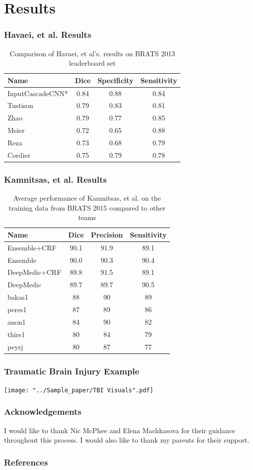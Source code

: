 \documentclass{beamer}
\begin{document}
\section*{Results}

\begin{frame} 
	\frametitle{Havaei, et al. Results}
	\begin{table}
	\begin{tabular}{l | c | c | c }
	Name & Dice & Specificity & Sensitivity\\
	\hline
	\cellcolor{blue!25}InputCascadeCNN* & 0.84 & 0.88 & 0.84\\
	Tustison & 0.79 & 0.83 & 0.81\\
	Zhao & 0.79 & 0.77 & 0.85\\
	Meier & 0.72 & 0.65 & 0.88\\
	Reza & 0.73 & 0.68 & 0.79\\
	Cordier & 0.75 & 0.79 & 0.78
	\end{tabular}
	\caption{Comparison of Havaei, et al's. results on BRATS 2013 leaderboard set}
	\end{table}
\end{frame}

\begin{frame} 
	\frametitle{Kamnitsas, et al. Results}
	\begin{table}
	\begin{tabular}{l | c | c | c }
	Name & Dice & Precision & Sensitivity\\
	\hline
	\cellcolor{blue!25}Ensemble+CRF & 90.1 & 91.9 & 89.1\\
	\cellcolor{blue!25}Ensemble & 90.0 & 90.3 & 90.4\\
	\cellcolor{blue!25}DeepMedic+CRF & 89.8 & 91.5 & 89.1\\
	\cellcolor{blue!25}DeepMedic & 89.7 & 89.7 & 90.5\\
	bakas1 & 88 & 90 & 89\\
	peres1 & 87 & 89 & 86\\
	anon1 & 84 & 90 & 82\\
	thirs1 & 80 & 84 & 79\\
	peyrj & 80 & 87 & 77
	\end{tabular}
	\caption{Average performance of Kamnitsas, et al. on the training data from BRATS 2015 compared to other teams}
	\end{table}
\end{frame}

\begin{frame} 
	\frametitle{Traumatic Brain Injury Example}
    \texttt{[image: "../Sample\_paper/TBI Visuals".pdf]}
    \\
\end{frame}

\begin{frame}
	\frametitle{Acknowledgements}
	I would like to thank Nic McPhee and Elena Machkasova for their guidance throughout this process. I would also like to thank my parents for their support.
\end{frame}

\begin{frame} 
	\frametitle{References}
	
	
\end{frame}
\end{document}
